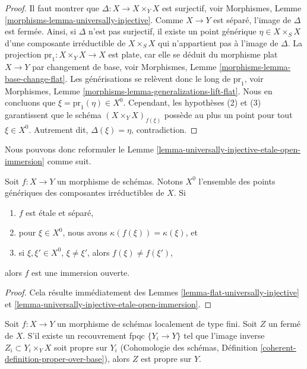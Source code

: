 \begin{proof}
Il faut montrer que $\Delta : X \to X \times_Y X$ est surjectif, voir
Morphismes, Lemme \ref{morphisms-lemma-universally-injective}.
Comme $X \to Y$ est séparé, l'image de $\Delta$ est fermée.
Ainsi, si $\Delta$ n'est pas surjectif, il existe un point générique
$\eta \in X \times_S X$ d'une composante irréductible de $X \times_S X$
qui n'appartient pas à l'image de $\Delta$. La projection
$\text{pr}_1 : X \times_Y X \to X$
est plate, car elle se déduit du morphisme plat $X \to Y$ par changement de
base, voir Morphismes, Lemme \ref{morphisms-lemma-base-change-flat}.
Les générisations se relèvent donc le long de $\text{pr}_1$, voir
Morphismes, Lemme \ref{morphisms-lemma-generalizations-lift-flat}.
Nous en concluons que $\xi = \text{pr}_1(\eta) \in X^0$.
Cependant, les hypothèses (2) et (3) garantissent que le schéma
$(X \times_Y X)_{f(\xi)}$ possède au plus un point pour tout $\xi \in X^0$.
Autrement dit, $\Delta(\xi) = \eta$, contradiction.
\end{proof}

\noindent
Nous pouvons donc reformuler le
Lemme \ref{lemma-universally-injective-etale-open-immersion} comme suit.

\begin{lemma}
\label{lemma-characterize-open-immersion}
Soit $f : X \to Y$ un morphisme de schémas. Notons $X^0$ l'ensemble
des points génériques des composantes irréductibles de $X$. Si
\begin{enumerate}
\item $f$ est \'etale et séparé,
\item pour $\xi \in X^0$, nous avons $\kappa(f(\xi)) = \kappa(\xi)$, et
\item si $\xi, \xi' \in X^0$, $\xi \not = \xi'$, alors
$f(\xi) \not = f(\xi')$,
\end{enumerate}
alors $f$ est une immersion ouverte.
\end{lemma}

\begin{proof}
Cela résulte immédiatement des Lemmes
\ref{lemma-flat-universally-injective} et
\ref{lemma-universally-injective-etale-open-immersion}.
\end{proof}

\begin{lemma}
\label{lemma-descending-property-proper-over-base}
Soit $f : X \to Y$ un morphisme de schémas localement de type fini.
Soit $Z$ un fermé de $X$. S'il existe un recouvrement fpqc
$\{Y_i \to Y\}$ tel que l'image inverse $Z_i \subset Y_i \times_Y X$
soit propre sur $Y_i$
(Cohomologie des schémas,
Définition \ref{coherent-definition-proper-over-base}),
alors $Z$ est propre sur $Y$.
\end{lemma}

